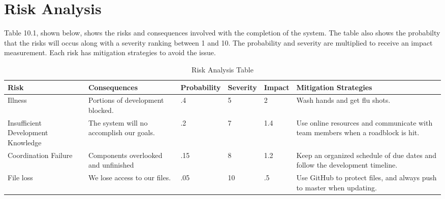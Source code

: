 \chapter{Risk Analysis}

Table 10.1, shown below, shows the risks and consequences involved with the completion of the system. The table also shows the probabilty that the risks will occus along with a severity ranking between 1 and 10. The probability and severity are multiplied to receive an impact measurement. Each risk has mitigation strategies to avoid the issue.

\pagebreak
\begin{table}
    \centering
    \begin{tabular}{ | p{3cm} | p{3cm} | l | l | l | p{5cm} |}
    \hline
    Risk & Consequences & Probability & Severity & Impact & Mitigation Strategies \\ \hline
    Illness & Portions of development blocked. & .4 & 5 & 2 & Wash hands and get flu shots. \\ \hline
    Insufficient Development Knowledge & The system will no accomplish our goals. & .2 & 7 & 1.4 & Use online resources and communicate with team members when a roadblock is hit. \\ \hline
    Coordination Failure & Components overlooked and unfinished & .15 & 8 & 1.2 & Keep an organized schedule of due dates and follow the development timeline. \\ \hline
    File loss & We lose access to our files. & .05 & 10 & .5 & Use GitHub to protect files, and always push to master when updating. \\
    \hline
    \end{tabular}
    \caption{Risk Analysis Table}
    \label{tab:risks}
\end{table}

